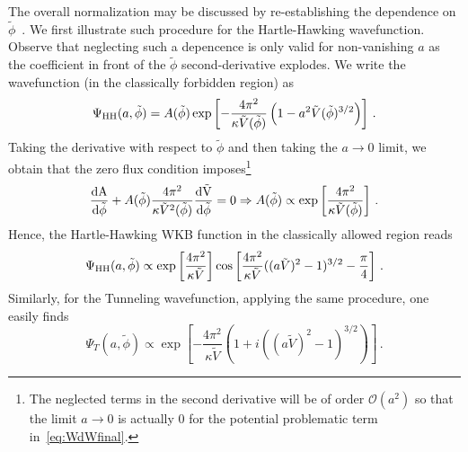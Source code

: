 \documentclass[a4paper,11pt]{article}
\begin{document}
The overall normalization may be discussed by re-establishing the dependence on $\tilde{\phi}$~\cite{halliwell2009introductorylecturesquantumcosmology}. We first illustrate such procedure for the Hartle-Hawking wavefunction. Observe that neglecting such a depencence is only valid for non-vanishing $a$ as the coefficient in front of the $\tilde{\phi}$ second-derivative explodes. We write the wavefunction (in the classically forbidden region) as
\begin{equation}
    \Psi_{\rm HH}(a,\tilde{\phi}) = A(\tilde{\phi})\exp\left[-\frac{4\pi^2}{\kappa \tilde{V}(\tilde{\phi})}\left(1-a^2 \tilde{V}(\tilde{\phi})^{3/2}\right)\right]\,.
\end{equation}
Taking the derivative with respect to $\tilde{\phi}$ and then taking the $a\to 0$ limit, we obtain that the zero flux condition imposes\footnote{The neglected terms in the second derivative will be of order $\mathcal{O}(a^2)$ so that the limit $a \to 0$ is actually $0$ for the potential problematic term in~\eqref{eq:WdWfinal}.}
\begin{equation}
    \frac{\rm{d}A}{\rm{d}\tilde{\phi}}+A(\tilde{\phi})\frac{4\pi^2}{\kappa\tilde{V}^2(\tilde{\phi})}\frac{\rm{d}\tilde{V}}{\rm{d}\tilde{\phi}} =0 \Rightarrow A(\tilde{\phi}) \propto \exp\left[\frac{4\pi^2}{\kappa \tilde{V}(\tilde{\phi})}\right] \,.
\end{equation}
Hence, the Hartle-Hawking WKB function in the classically allowed region reads
\begin{equation}
    \Psi_{\rm HH}(a,\tilde{\phi}) \propto \exp\left[\frac{4\pi^2}{\kappa \tilde{V}}\right]\cos\left[\frac{4\pi^2}{\kappa \tilde{V}}((a \tilde{V})^2-1)^{3/2}-\frac{\pi}{4}\right]\,.
\end{equation}
Similarly, for the Tunneling wavefunction, applying the same procedure, one easily finds
\begin{equation}
    \Psi_{T}(a,\tilde{\phi})  \propto \exp\left[-\frac{4\pi^2}{\kappa \tilde{V}}\left(1+i\left((a\tilde{V})^2-1\right)^{3/2}\right)\right]\,.
\end{equation}

\end{document}
